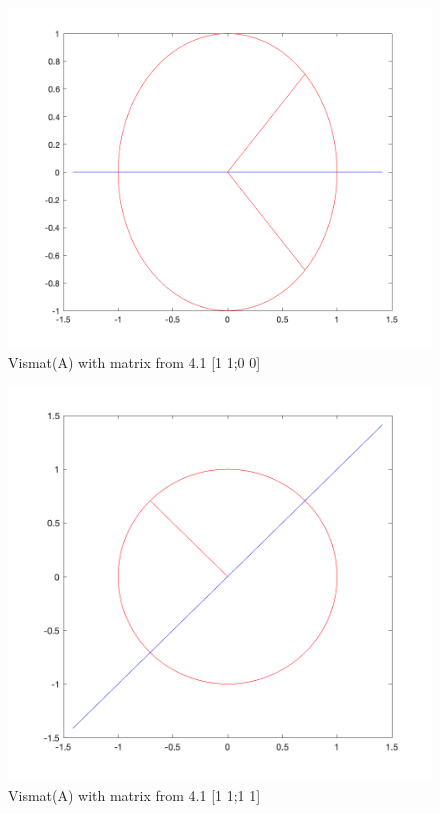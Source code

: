 \documentclass[12pt]{article}
\makeatletter
\theoremstyle{homework}
\newenvironment{exercise}[1]
{\def\@currentlabel{#1}\exercisecore}
{\endexercisecore}
\makeatother
\begin{document}
\begin{exercise}{4.3}
\begin{figure}[H]
\begin{center}
            \end{center}
          \end{figure}
          \begin{figure}[H]
            \begin{center}
              \caption{Vismat(A) with matrix from 4.1 [1 1;0 0]}
              \includegraphics[width=.75\textwidth]{plot4.png}
            \end{center}
          \end{figure}
          \begin{figure}[H]
            \begin{center}
              \caption{Vismat(A) with matrix from 4.1 [1 1;1 1]}
              \includegraphics[width=.75\textwidth]{plot5.png}
            \end{center}
          \end{figure}
\end{exercise}
\end{document}
